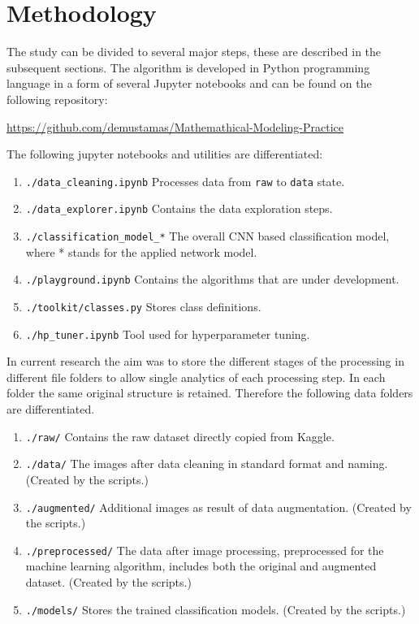 \documentclass[10pt, final]{article}
\begin{document}
\section{Methodology} \label{sec:method}
The study can be divided to several major steps, these are described in the subsequent sections.
The algorithm is developed in Python programming language in a form of several Jupyter notebooks and can
be found on the following repository:

\noindent
\url{https://github.com/demustamas/Mathemathical-Modeling-Practice}

The following jupyter notebooks and utilities are differentiated:

\begin{enumerate}
	\item \lstinline{./data_cleaning.ipynb} Processes data from \lstinline{raw} to \lstinline{data} state.
	\item \lstinline{./data_explorer.ipynb} Contains the data exploration steps.
	\item \lstinline{./classification_model_*} The overall CNN based classification model,
	      where * stands for the applied network model.
	\item \lstinline{./playground.ipynb} Contains the algorithms that are under development.
	\item \lstinline{./toolkit/classes.py} Stores class definitions.
	\item \lstinline{./hp_tuner.ipynb} Tool used for hyperparameter tuning.
\end{enumerate}

In current research the aim was to store the different stages of the processing in different file
folders to allow single analytics of each processing step.
In each folder the same original structure is retained.
Therefore the following data folders are differentiated.

\begin{enumerate}
	\item \lstinline{./raw/} Contains the raw dataset directly copied from Kaggle.
	\item \lstinline{./data/} The images after data cleaning in standard format and naming. (Created by the scripts.)
	\item \lstinline{./augmented/} Additional images as result of data augmentation. (Created by the scripts.)
	\item \lstinline{./preprocessed/} The data after image processing, preprocessed for the machine learning
	      algorithm, includes both the original and augmented dataset. (Created by the scripts.)
	\item \lstinline{./models/} Stores the trained classification models. (Created by the scripts.)
\end{enumerate}
\end{document}
